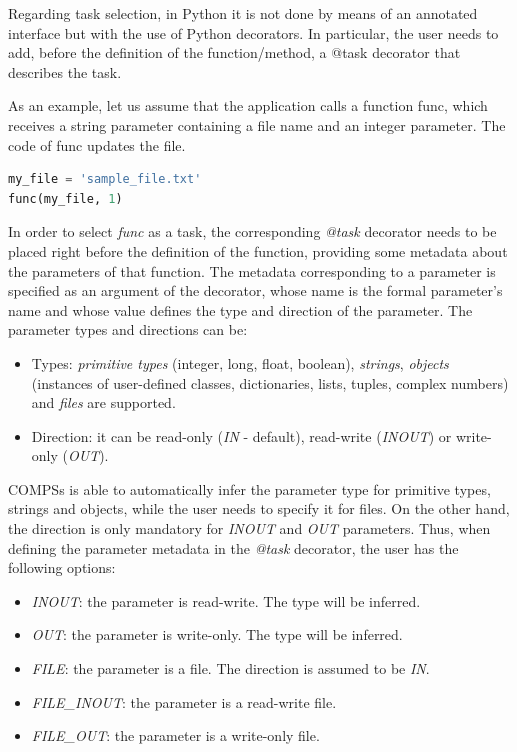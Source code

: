 Regarding task selection, in Python it is not done by means of an annotated interface but with the use of 
Python decorators. In particular, the user needs to add, before the definition of the function/method, 
a @task decorator that describes the task.

As an example, let us assume that the application calls a function func, which receives a string parameter 
containing a file name and an integer parameter. The code of func updates the file.

\begin{lstlisting}[language=python]
my_file = 'sample_file.txt'
func(my_file, 1)
\end{lstlisting}

In order to select {\it func} as a task, the corresponding {\it @task} decorator needs to be placed right 
before the definition of the function, providing some metadata about the parameters of that function. 
The metadata corresponding to a parameter is specified as an argument of the decorator, whose name is 
the formal parameter’s name and whose value defines the type and direction of the parameter. 
The parameter types and directions can be:

\begin{itemize}
 \item Types: {\it primitive types} (integer, long, float, boolean), {\it strings}, {\it objects} (instances of user-defined classes, dictionaries, lists, tuples, complex numbers) and {\it files} are supported.
 \item Direction: it can be read-only ({\it IN} - default), read-write ({\it INOUT}) or write-only ({\it OUT}).
\end{itemize}

COMPSs is able to automatically infer the parameter type for primitive types, strings and objects, 
while the user needs to specify it for files. On the other hand, the direction is only mandatory for 
{\it INOUT} and {\it OUT} parameters. Thus, when defining the parameter metadata in the {\it @task} 
decorator, the user has the following options:

\begin{itemize}
 \item {\it INOUT}: the parameter is read-write. The type will be inferred.
 \item {\it OUT}: the parameter is write-only. The type will be inferred.
 \item {\it FILE}: the parameter is a file. The direction is assumed to be {\it IN}.
 \item {\it FILE\_INOUT}: the parameter is a read-write file.
 \item {\it FILE\_OUT}: the parameter is a write-only file.
\end{itemize}
     

